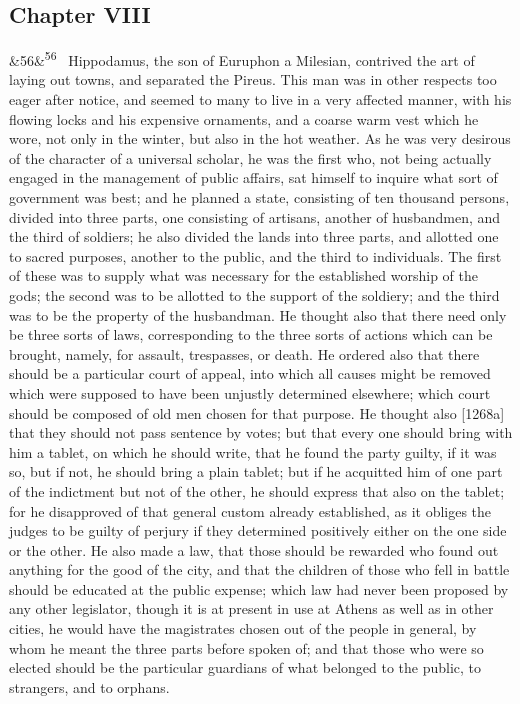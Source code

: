 \documentclass[12pt]{article}
\newcommand{\para}[1][]{\par\noindent\ifx&#1&\else\textsuperscript{\footnotesize #1}~\fi}
\begin{document}
\subsection*{Chapter VIII}

\para[56] Hippodamus, the son of Euruphon a Milesian, contrived the art of laying out towns, and separated the Pireus. This man was in other respects too eager after notice, and seemed to many to live in a very affected manner, with his flowing locks and his expensive ornaments, and a coarse warm vest which he wore, not only in the winter, but also in the hot weather. As he was very desirous of the character of a universal scholar, he was the first who, not being actually engaged in the management of public affairs, sat himself to inquire what sort of government was best; and he planned a state, consisting of ten thousand persons, divided into three parts, one consisting of artisans, another of husbandmen, and the third of soldiers; he also divided the lands into three parts, and allotted one to sacred purposes, another to the public, and the third to individuals. The first of these was to supply what was necessary for the established worship of the gods; the second was to be allotted to the support of the soldiery; and the third was to be the property of the husbandman. He thought also that there need only be three sorts of laws, corresponding to the three sorts of actions which can be brought, namely, for assault, trespasses, or death. He ordered also that there should be a particular court of appeal, into which all causes might be removed which were supposed to have been unjustly determined elsewhere; which court should be composed of old men chosen for that purpose. He thought also [1268a] that they should not pass sentence by votes; but that every one should bring with him a tablet, on which he should write, that he found the party guilty, if it was so, but if not, he should bring a plain tablet; but if he acquitted him of one part of the indictment but not of the other, he should express that also on the tablet; for he disapproved of that general custom already established, as it obliges the judges to be guilty of perjury if they determined positively either on the one side or the other. He also made a law, that those should be rewarded who found out anything for the good of the city, and that the children of those who fell in battle should be educated at the public expense; which law had never been proposed by any other legislator, though it is at present in use at Athens as well as in other cities, he would have the magistrates chosen out of the people in general, by whom he meant the three parts before spoken of; and that those who were so elected should be the particular guardians of what belonged to the public, to strangers, and to orphans.
\end{document}
